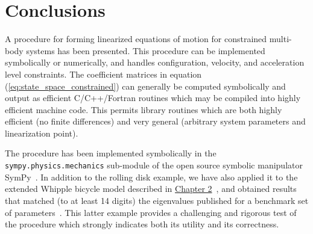 \section{Conclusions}
A procedure for forming linearized equations of motion for constrained
multi-body systems has been presented. This procedure can be implemented
symbolically or numerically, and handles configuration, velocity, and
acceleration level constraints. The coefficient matrices in equation
(\ref{eq:state_space_constrained}) can generally be computed symbolically and
output as efficient C/C++/Fortran routines which may be compiled into highly
efficient machine code. This permits library routines which are both highly
efficient (no finite differences) and very general (arbitrary system parameters
and linearization point).

The procedure has been implemented symbolically in the
\texttt{sympy.physics.mechanics} sub-module of the open source symbolic
manipulator SymPy~\cite{SymPy}. In addition to the rolling disk example, we
have also applied it to the extended Whipple bicycle model described in
\hyperref[chapter2]{Chapter 2}~\cite{libbicycle}, and obtained results that matched (to at
least 14 digits) the eigenvalues published for a benchmark set of
parameters~\cite{Meijaard2007}. This latter example provides a challenging and
rigorous test of the procedure which strongly indicates both its utility and
its correctness.

